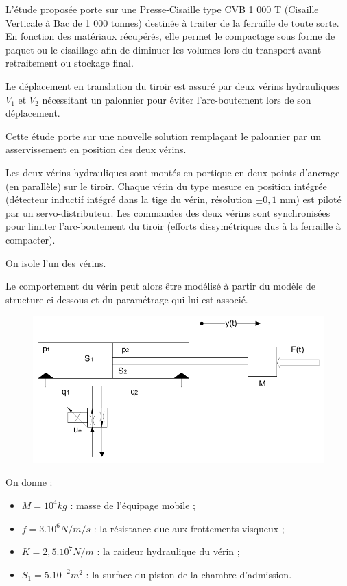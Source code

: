 L'étude proposée porte sur une Presse-Cisaille type CVB 1 000 T (Cisaille Verticale à Bac de 1 000 tonnes) destinée à traiter de la ferraille de toute sorte. En fonction des matériaux récupérés, elle permet le compactage sous forme de paquet ou le cisaillage afin de diminuer les volumes lors du transport avant retraitement ou stockage final.

Le déplacement en translation du tiroir est assuré par deux vérins hydrauliques $V_1$ et $V_2$ nécessitant un palonnier pour éviter l'arc-boutement lors de son déplacement.

Cette étude porte sur une nouvelle solution remplaçant le palonnier par un asservissement en position des deux vérins.

Les deux vérins hydrauliques sont montés en portique en deux points d'ancrage (en parallèle) sur le tiroir. Chaque vérin du type \og mesure en position intégrée \fg (détecteur inductif intégré dans la tige du vérin, résolution $\pm 0,1$ mm) est piloté par un servo-distributeur. Les commandes des deux vérins sont synchronisées pour limiter l'arc-boutement du tiroir (efforts dissymétriques dus à la ferraille à compacter).

On isole l'un des vérins.

Le comportement du vérin peut alors être modélisé à partir du modèle de structure ci-dessous et du paramétrage qui lui est associé.

\begin{figure}[!h]
 \centering\includegraphics[width=0.6\linewidth]{img/fig3.png}
\end{figure}

On donne :
\begin{itemize}
 \item $M=10^4kg$ : masse de l'équipage mobile ;
 \item $f=3.10^6N/m/s$ : la résistance due aux frottements visqueux ;
 \item $K=2,5.10^7N/m$ : la raideur hydraulique du vérin ;
 \item $S_1=5.10^{-2}m^2$ : la surface du piston de la chambre d'admission.
\end{itemize}

